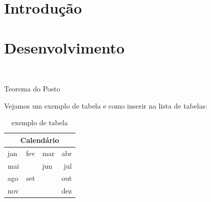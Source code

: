 \documentclass[12pt,oneside]{book} %
\begin{document}
    \chapter{Introdução}
    \thispagestyle{empty}










    \chapter{Desenvolvimento}
    \thispagestyle{empty}

    \

    \par Teorema do Posto 

    \par Vejamos um exemplo de tabela e como inserir na lista de tabelas: \vspace{1.5cm}

    \begin{table}[h] %
        \begin{center}
            \begin{tabular}{|l|c||lr} %
                \hline
                \multicolumn{4}{|c|}{Calendário} \\ \hline \hline
                jan & fev & mar & abr \\ \hline
                mai & & jun & jul \\ \cline{1-1} \cline{3-4}
                ago & set & & out \\
                nov & & & dez
            \end{tabular}
        \end{center}
        \caption{exemplo de tabela}
    \end{table}
\end{document}
